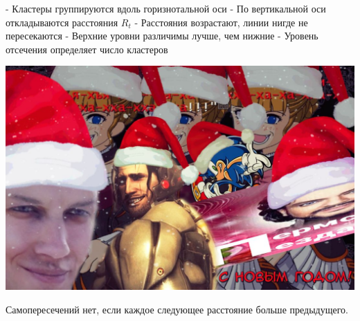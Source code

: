 - Кластеры группируются вдоль горизнотальной оси
- По вертикальной оси откладываются расстояния $R_t$
- Расстояния возрастают, линии нигде не пересекаются
- Верхние уровни различимы лучше, чем нижние
- Уровень отсечения определяет число кластеров

\includegraphics[scale=0.3]{figures/samplefigure.jpg}

Самопересечений нет, если каждое следующее расстояние больше предыдущего.